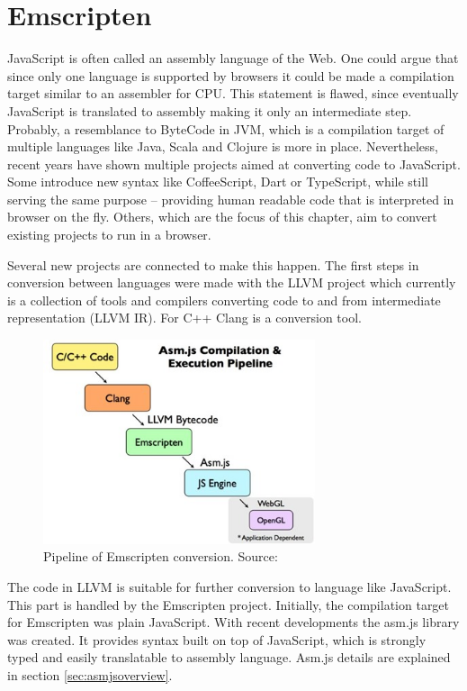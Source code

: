 \chapter{Emscripten}
\label{cha:emscripten}

JavaScript is often called an assembly language of the Web.\cite{javascript-assembly-of-web} One could argue that since only one language is supported by browsers it could be made a compilation target similar to an assembler for CPU. This statement is flawed, since eventually JavaScript is translated to assembly making it only an intermediate step. Probably, a resemblance to ByteCode in JVM, which is a compilation target of multiple languages like Java, Scala and Clojure is more in place.
Nevertheless, recent years have shown multiple projects aimed at converting code to JavaScript. Some introduce new syntax like CoffeeScript, Dart or TypeScript, while still serving the same purpose -- providing human readable code that is interpreted in browser on the fly. Others, which are the focus of this chapter, aim to convert existing projects to run in a browser.

Several new projects are connected to make this happen. The first steps in conversion between languages were made with the LLVM project\cite{llvm} which currently is a collection of tools and compilers converting code to and from intermediate representation (LLVM IR). For C++ Clang\cite{clang} is a conversion tool.

\begin{figure}[h!]
  \caption{Pipeline of Emscripten conversion. Source: \cite{javascript-assembly-of-web}}
  \label{img:emscriptenpipeline}
  \centering
	\includegraphics[width=8cm]{emscripten/pipeline.jpg}
\end{figure}

The code in LLVM is suitable for further conversion to language like JavaScript. This part is handled by the Emscripten\cite{emscripten} project. Initially, the compilation target for Emscripten was plain JavaScript. With recent developments the asm.js\cite{asmjs} library was created. It provides syntax built on top of JavaScript, which is strongly typed and easily translatable to assembly language. Asm.js details are explained in section \ref{sec:asmjsoverview}.

